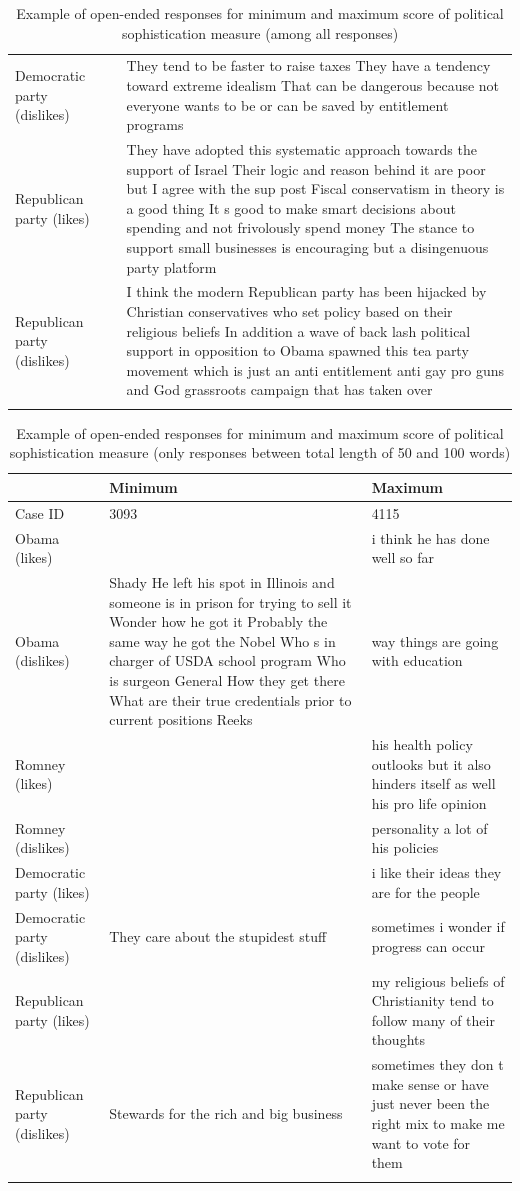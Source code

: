 \documentclass[12pt]{article}
\begin{document}
\begin{longtable}[ht]{p{1.4cm}lp{12cm}}
  Democratic party (dislikes) &  & They tend to be faster to raise taxes They have a tendency toward extreme idealism That can be dangerous because not everyone wants to be or can be saved by entitlement programs \\ 
  Republican party (likes) &  & They have adopted this systematic approach towards the support of Israel Their logic and reason behind it are poor but I agree with the sup post Fiscal conservatism in theory is a good thing It s good to make smart decisions about spending and not frivolously spend money The stance to support small businesses is encouraging but a disingenuous party platform \\ 
  Republican party (dislikes) &  & I think the modern Republican party has been hijacked by Christian conservatives who set policy based on their religious beliefs In addition a wave of back lash political support in opposition to Obama spawned this tea party movement which is just an anti entitlement anti gay pro guns and God grassroots campaign that has taken over \\ 
   \hline
   
   \caption{Example of open-ended responses for minimum and maximum score of political sophistication measure (among all responses)}
\end{longtable}

\newpage
\begin{longtable}[ht]{p{4cm}p{6cm}p{6cm}}
  \hline
 & Minimum & Maximum \\ 
  \hline
Case ID & 3093 & 4115 \\ 
  Obama (likes) &  & i think he has done well so far \\ 
  Obama (dislikes) & Shady He left his spot in Illinois and someone is in prison for trying to sell it Wonder how he got it Probably the same way he got the Nobel Who s in charger of USDA school program Who is surgeon General How they get there What are their true credentials prior to current positions Reeks & way things are going with education \\ 
  Romney (likes) &  & his health policy outlooks but it also hinders itself as well his pro life opinion \\ 
  Romney (dislikes) &  & personality a lot of his policies \\ 
  Democratic party (likes) &  & i like their ideas they are for the people \\ 
  Democratic party (dislikes) & They care about the stupidest stuff & sometimes i wonder if progress can occur \\ 
  Republican party (likes) &  & my religious beliefs of Christianity tend to follow many of their thoughts \\ 
  Republican party (dislikes) & Stewards for the rich and big business & sometimes they don t make sense or have just never been the right mix to make me want to vote for them \\ 
   \hline
  \caption{Example of open-ended responses for minimum and maximum score of political sophistication measure (only responses between total length of 50 and 100 words)}
  \label{tab:ex1}
\end{longtable}
\end{document}
